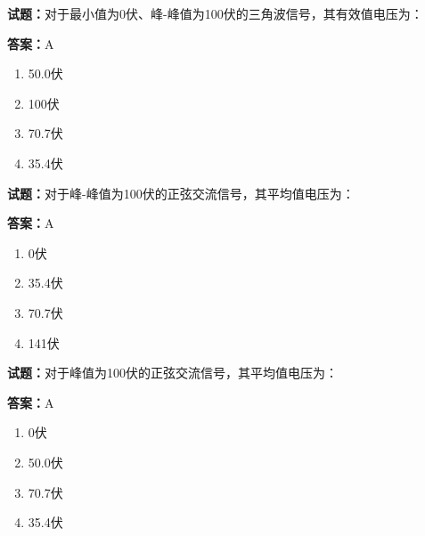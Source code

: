 \documentclass{ctexbook}
\begin{document}





\vspace{1em}

\textbf{试题：}对于最小值为0伏、峰-峰值为100伏的三角波信号，其有效值电压为： 

\textbf{答案：}A 

\begin{enumerate}[leftmargin=3em]
  \item 50.0伏 

  \item 100伏 

  \item 70.7伏 

  \item 35.4伏 

\end{enumerate}





\vspace{1em}

\textbf{试题：}对于峰-峰值为100伏的正弦交流信号，其平均值电压为： 

\textbf{答案：}A 

\begin{enumerate}[leftmargin=3em]
  \item 0伏 

  \item 35.4伏 

  \item 70.7伏 

  \item 141伏 

\end{enumerate}





\vspace{1em}

\textbf{试题：}对于峰值为100伏的正弦交流信号，其平均值电压为： 

\textbf{答案：}A 

\begin{enumerate}[leftmargin=3em]
  \item 0伏 

  \item 50.0伏 

  \item 70.7伏 

  \item 35.4伏 

\end{enumerate}
\end{document}
